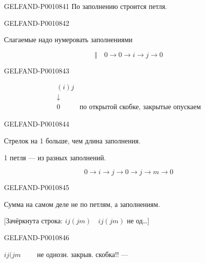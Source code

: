 \begin{GelfandAdjacentEvidence}{GELFAND-P001084}{1}
По заполнению строится петля.

\end{GelfandAdjacentEvidence}
\begin{GelfandAdjacentEvidence}{GELFAND-P001084}{2}

Слагаемые надо нумеровать заполнениями

\[
\Vert\quad 0\longrightarrow 0\longrightarrow i\longrightarrow j\longrightarrow 0
\]
\end{GelfandAdjacentEvidence}
\begin{GelfandAdjacentEvidence}{GELFAND-P001084}{3}


\[
\begin{array}{cl}
(i)j & \\
\downarrow & \\
0 & \text{по открытой скобке, закрытые опускаем}
\end{array}
\]
\end{GelfandAdjacentEvidence}
\begin{GelfandAdjacentEvidence}{GELFAND-P001084}{4}


Стрелок на 1 больше, чем длина заполнения.

1 петля — из разных заполнений.

\[
0\longrightarrow i\longrightarrow j\longrightarrow 0
\longrightarrow j\longrightarrow m\longrightarrow 0
\]
\end{GelfandAdjacentEvidence}
\begin{GelfandAdjacentEvidence}{GELFAND-P001084}{5}


Сумма на самом деле не по петлям, а заполнениям.

[Зачёркнута строка: $ij(jm)\quad ij(jm)$ не од…]
\end{GelfandAdjacentEvidence}
\begin{GelfandAdjacentEvidence}{GELFAND-P001084}{6}


$ij(jm\qquad$ не однозн. закрыв. скобка!! —
\end{GelfandAdjacentEvidence}
